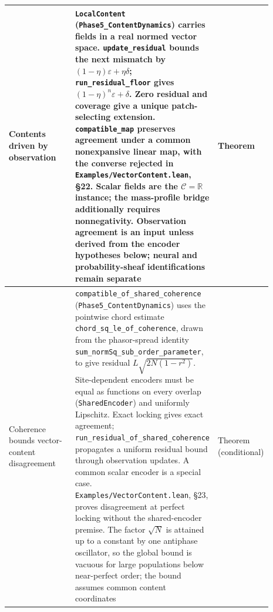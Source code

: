 \documentclass{article}
\begin{document}
\begin{longtable}{|>{\raggedright\arraybackslash}p{0.26\linewidth}|>{\raggedright\arraybackslash}p{0.46\linewidth}|>{\raggedright\arraybackslash}p{0.17\linewidth}|}
Contents driven by observation & \texttt{LocalContent} (\nolinkurl{Phase5_ContentDynamics}) carries fields in a real normed vector space. \nolinkurl{update_residual} bounds the next mismatch by $(1-\eta)\varepsilon+\eta\delta$; \nolinkurl{run_residual_floor} gives $(1-\eta)^n\varepsilon+\delta$. Zero residual and coverage give a unique patch-selecting extension. \nolinkurl{compatible_map} preserves agreement under a common nonexpansive linear map, with the converse rejected in \nolinkurl{Examples/VectorContent.lean}, \S22. Scalar fields are the $\mathcal{C}=\mathbb{R}$ instance; the mass-profile bridge additionally requires nonnegativity. Observation agreement is an input unless derived from the encoder hypotheses below; neural and probability-sheaf identifications remain separate & Theorem \\ \hline
Coherence bounds vector-content disagreement & \nolinkurl{compatible_of_shared_coherence} (\nolinkurl{Phase5_ContentDynamics}) uses the pointwise chord estimate \nolinkurl{chord_sq_le_of_coherence}, drawn from the phasor-spread identity \nolinkurl{sum_normSq_sub_order_parameter}, to give residual $L\sqrt{2N(1-r^2)}$. Site-dependent encoders must be equal as functions on every overlap (\texttt{SharedEncoder}) and uniformly Lipschitz. Exact locking gives exact agreement; \nolinkurl{run_residual_of_shared_coherence} propagates a uniform residual bound through observation updates. A common scalar encoder is a special case. \nolinkurl{Examples/VectorContent.lean}, \S23, proves disagreement at perfect locking without the shared-encoder premise. The factor $\sqrt N$ is attained up to a constant by one antiphase oscillator, so the global bound is vacuous for large populations below near-perfect order; the bound assumes common content coordinates & Theorem (conditional) \\ \hline

\end{longtable}
\end{document}
